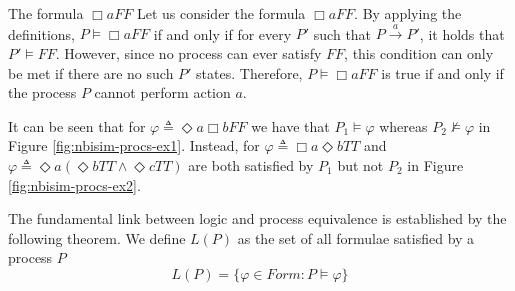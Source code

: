 \begin{Example}{The formula $\Box a FF$}{}
    Let us consider the formula $\Box a FF$.
    By applying the definitions, $P \models \Box a FF$ if and only if for every $P'$ such that $P \xrightarrow{a} P'$, it holds that $P' \models FF$. However, since no process can ever satisfy $FF$, this condition can only be met if there are no such $P'$ states. Therefore, $P \models \Box a FF$ is true if and only if the process $P$ cannot perform action $a$.  
\end{Example}

It can be seen that for $\varphi\triangleq\Diamond a\Box b FF$ we have that $P_1\models\varphi$ whereas $P_2\not\models\varphi$ in Figure \ref{fig:nbisim-procs-ex1}. Instead, for $\varphi\triangleq\Box a\Diamond b TT$ and $\varphi\triangleq\Diamond a(\Diamond b TT \land \Diamond c TT)$ are both satisfied by $P_1$ but not $P_2$ in Figure \ref{fig:nbisim-procs-ex2}.

The fundamental link between logic and process equivalence is established by the following theorem. We define $L(P)$ as the set of all formulae satisfied by a process $P$
\begin{equation*}
    L(P) = \{\varphi\in Form : P \models \varphi\}
\end{equation*}

